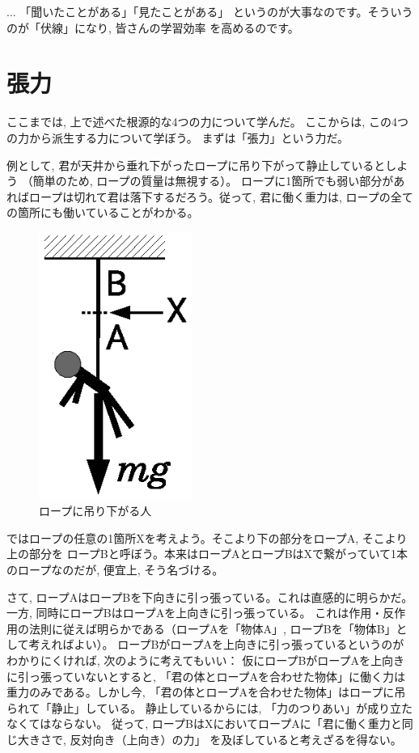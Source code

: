 \begin{faq}{\small{}
... 「聞いたことがある」「見たことがある」
というのが大事なのです。そういうのが「伏線」になり, 皆さんの学習効率
を高めるのです。}\end{faq}\mv


\section{張力}
ここまでは, 上で述べた根源的な4つの力について学んだ。
ここからは, この4つの力から派生する力について学ぼう。
まずは「張力」という力だ。

例として, 君が天井から垂れ下がったロープに吊り下がって静止しているとしよう
（簡単のため, ロープの質量は無視する）。
ロープに1箇所でも弱い部分があればロープは切れて君は落下するだろう。従って, 
君に働く重力は, ロープの全ての箇所にも働いていることがわかる。
\begin{figure}[h]
    \centering
    \includegraphics[width=5cm]{string.eps}
    \caption{ロープに吊り下がる人}\label{fig:string}
\end{figure}

ではロープの任意の1箇所Xを考えよう。そこより下の部分をロープA, そこより上の部分を
ロープBと呼ぼう。本来はロープAとロープBはXで繋がっていて1本のロープなのだが, 
便宜上, そう名づける。

さて, ロープAはロープBを下向きに引っ張っている。これは直感的に明らかだ。
一方, 同時にロープBはロープAを上向きに引っ張っている。
これは作用・反作用の法則に従えば明らかである（ロープAを「物体A」, ロープBを「物体B」として考えればよい）。
ロープBがロープAを上向きに引っ張っているというのがわかりにくければ, 次のように考えてもいい：
仮にロープBがロープAを上向きに引っ張っていないとすると, 
「君の体とロープAを合わせた物体」に働く力は重力のみである。しかし今, 
「君の体とロープAを合わせた物体」はロープに吊られて「静止」している。
静止しているからには, 「力のつりあい」が成り立たなくてはならない。
従って, ロープBはXにおいてロープAに「君に働く重力と同じ大きさで, 反対向き（上向き）の力」
を及ぼしていると考えざるを得ない。

